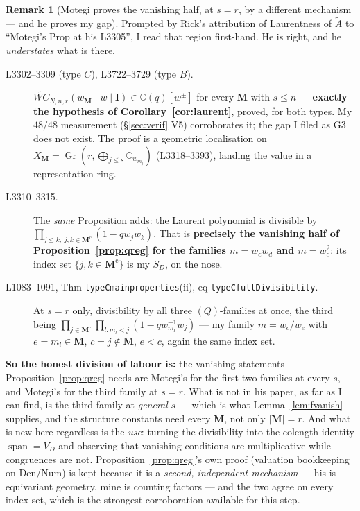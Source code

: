 \documentclass[11pt]{article}
\theoremstyle{definition}
\newtheorem{rem}[thm]{Remark}
\newcommand{\At}{\widetilde{A}}
\newcommand{\bM}{\mathbf{M}}
\newcommand{\bI}{\mathbf{I}}
\begin{document}
\begin{rem}[Motegi proves the vanishing half, at $s=r$, by a different mechanism ---
and he proves my gap]\label{rem:motegi}
Prompted by Rick's attribution of Laurentness of $\At$ to ``Motegi's Prop at his
L3305'', I read that region first-hand.  He is right, and he \emph{understates}
what is there.
\begin{description}
\item[L3302--3309 (type $C$), L3722--3729 (type $B$).]
  $\widetilde{WC}_{N,n,r}(w_{\bM}\mid w\mid\bI)\in\mathbb{C}(q)[w^{\pm}]$ for
  every $\bM$ with $s\le n$ --- \textbf{exactly the hypothesis of
  Corollary~\ref{cor:laurent}}, proved, for both types.  My $48/48$ measurement
  (\S\ref{sec:verif} V5) corroborates it; the gap I filed as G3 does not exist.
  The proof is a geometric localisation on
  $X_{\bM}=\operatorname{Gr}(r,\bigoplus_{j\le s}\mathbb{C}_{w_{m_j}})$
  (L3318--3393), landing the value in a representation ring.
\item[L3310--3315.]  The \emph{same} Proposition adds: the Laurent polynomial is
  divisible by $\prod_{j\le k,\ j,k\in\bM^{\mathrm c}}(1-qw_jw_k)$.  That is
  \textbf{precisely the vanishing half of Proposition~\ref{prop:qreg} for the
  families $m=w_cw_d$ and $m=w_c^{2}$}: its index set $\{j,k\in\bM^{\mathrm c}\}$
  is my $S_D$, on the nose.
\item[L1083--1091, Thm \texttt{typeCmainproperties}(ii), eq
  \texttt{typeCfullDivisibility}.]  At $s=r$ only, divisibility by all three
  $(Q)$-families at once, the third being
  $\prod_{j\in\bM^{\mathrm c}}\prod_{l:m_l<j}(1-qw_{m_l}^{-1}w_j)$ --- my family
  $m=w_c/w_e$ with $e=m_l\in\bM$, $c=j\notin\bM$, $e<c$, again the same index set.
\end{description}
\textbf{So the honest division of labour is:} the vanishing statements
Proposition~\ref{prop:qreg} needs are Motegi's for the first two families at every
$s$, and Motegi's for the third family at $s=r$.  What is not in his paper, as far
as I can find, is the third family at \emph{general} $s$ --- which is what
Lemma~\ref{lem:fvanish} supplies, and the structure constants need every $\bM$,
not only $|\bM|=r$.  And what is new here regardless is the \emph{use}:
turning the divisibility into the colength identity
$\operatorname{span}=V_D$ and observing that vanishing conditions are
multiplicative while congruences are not.  Proposition~\ref{prop:qreg}'s own proof
(valuation bookkeeping on $\mathrm{Den}/\mathrm{Num}$) is kept because it is a
\emph{second, independent mechanism} --- his is equivariant geometry, mine is
counting factors --- and the two agree on every index set, which is the strongest
corroboration available for this step.
\end{rem}
\end{document}
